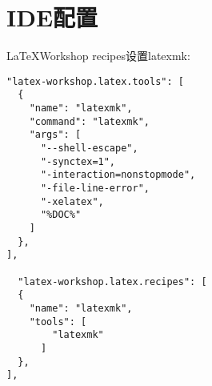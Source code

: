 \section{IDE配置}

\LaTeX Workshop recipes设置latexmk:

\begin{verbatim}
"latex-workshop.latex.tools": [
  {
    "name": "latexmk",
    "command": "latexmk",
    "args": [
      "--shell-escape",
      "-synctex=1",
      "-interaction=nonstopmode",
      "-file-line-error",
      "-xelatex",
      "%DOC%"
    ]
  },
],

  "latex-workshop.latex.recipes": [
  {
    "name": "latexmk",
    "tools": [
        "latexmk"
      ]
  },
],
\end{verbatim}
